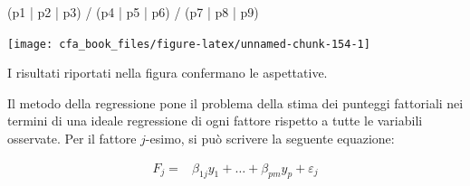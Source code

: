 \documentclass[
  11pt,
]{krantz}
\makeatletter
\newenvironment{Shaded}{\begin{snugshade}}{\end{snugshade}}
\newcommand{\AttributeTok}[1]{\textcolor[rgb]{0.61,0.61,0.61}{#1}}
\newcommand{\DecValTok}[1]{\textcolor[rgb]{0.06,0.06,0.06}{#1}}
\newcommand{\FloatTok}[1]{\textcolor[rgb]{0.06,0.06,0.06}{#1}}
\newcommand{\FunctionTok}[1]{\textcolor[rgb]{0,0,0}{#1}}
\newcommand{\NormalTok}[1]{#1}
\newcommand{\OtherTok}[1]{\textcolor[rgb]{0.37,0.37,0.37}{#1}}
\newcommand{\SpecialCharTok}[1]{\textcolor[rgb]{0,0,0}{#1}}
\newenvironment{kframe}{%
\medskip{}
\setlength{\fboxsep}{.8em}
 \def\at@end@of@kframe{}%
 \ifinner\ifhmode%
  \def\at@end@of@kframe{\end{minipage}}%
  \begin{minipage}{\columnwidth}%
 \fi\fi%
 \def\FrameCommand##1{\hskip\@totalleftmargin \hskip-\fboxsep
 \colorbox{shadecolor}{##1}\hskip-\fboxsep
     \hskip-\linewidth \hskip-\@totalleftmargin \hskip\columnwidth}%
 \MakeFramed {\advance\hsize-\width
   \@totalleftmargin\z@ \linewidth\hsize
   \@setminipage}}%
 {\par\unskip\endMakeFramed%
 \at@end@of@kframe}
\renewenvironment{Shaded}{\begin{kframe}}{\end{kframe}}
\theoremstyle{definition}
\theoremstyle{definition}
\theoremstyle{definition}
\theoremstyle{definition}
\theoremstyle{remark}
\makeatother
\begin{document}
\begin{Shaded}
\end{Shaded}

\begin{Shaded}
\begin{Highlighting}[]
\NormalTok{(p1 }\SpecialCharTok{|}\NormalTok{ p2 }\SpecialCharTok{|}\NormalTok{ p3) }\SpecialCharTok{/}
\NormalTok{  (p4 }\SpecialCharTok{|}\NormalTok{ p5 }\SpecialCharTok{|}\NormalTok{ p6) }\SpecialCharTok{/}
\NormalTok{  (p7 }\SpecialCharTok{|}\NormalTok{ p8 }\SpecialCharTok{|}\NormalTok{ p9)}
\end{Highlighting}
\end{Shaded}

\begin{center}\texttt{[image: cfa\_book\_files/figure-latex/unnamed-chunk-154-1]} \end{center}

I risultati riportati nella figura confermano le aspettative.

Il metodo della regressione pone il problema della stima dei punteggi fattoriali nei termini di una ideale regressione di ogni fattore rispetto a tutte le variabili osservate. Per il fattore \(j\)-esimo, si può scrivere la seguente equazione:

\[
\begin{aligned}
F_j =& \beta_{1j}y_1 + \dots + \beta_{pm}y_p + \varepsilon_j
\end{aligned}
\]
\end{document}
